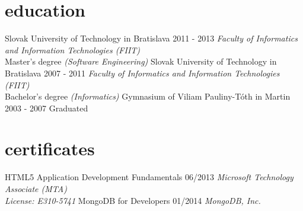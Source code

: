 \documentclass[a4paper]{cv}
\begin{document}
\section{education}
\begin{entrylist}
	\entry
		{Slovak University of Technology in Bratislava}
		{2011 - 2013}
		{\emph{Faculty of Informatics and Information Technologies (FIIT)}\\
		Master's degree \emph{(Software Engineering)}}
	\entry
		{Slovak University of Technology in Bratislava}
		{2007 - 2011}
		{\emph{Faculty of Informatics and Information Technologies (FIIT)}\\
		Bachelor's degree \emph{(Informatics)}}
	\entry
		{Gymnasium of Viliam Pauliny-Tóth in Martin}
		{2003 - 2007}
		{Graduated}
\end{entrylist}

\section{certificates}
\begin{entrylist}
	\entry
		{HTML5 Application Development Fundamentals}
		{06/2013}
		{\emph{Microsoft Technology Associate (MTA) \\ License: E310-5741}}
	\entry
		{MongoDB for Developers}
		{01/2014}
		{\emph{MongoDB, Inc.}}
\end{entrylist}

\end{document}
